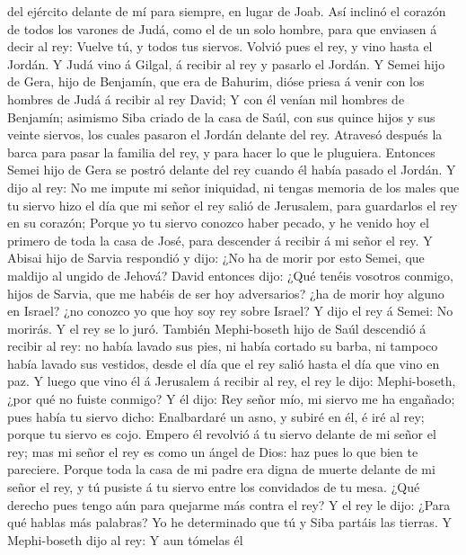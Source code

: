 del ejército delante de mí para siempre, en lugar de Joab. 
Así inclinó el corazón de todos los varones de Judá, como el de un solo
hombre, para que enviasen á decir al rey: Vuelve tú, y todos tus
siervos.  Volvió pues el rey, y vino hasta el Jordán. Y
Judá vino á Gilgal, á recibir al rey y pasarlo el Jordán. 
Y Semei hijo de Gera, hijo de Benjamín, que era de Bahurim, dióse priesa
á venir con los hombres de Judá á recibir al rey David;  Y
con él venían mil hombres de Benjamín; asimismo Siba criado de la casa
de Saúl, con sus quince hijos y sus veinte siervos, los cuales pasaron
el Jordán delante del rey.  Atravesó después la barca para
pasar la familia del rey, y para hacer lo que le pluguiera. Entonces
Semei hijo de Gera se postró delante del rey cuando él había pasado el
Jordán.  Y dijo al rey: No me impute mi señor iniquidad, ni
tengas memoria de los males que tu siervo hizo el día que mi señor el
rey salió de Jerusalem, para guardarlos el rey en su corazón;
 Porque yo tu siervo conozco haber pecado, y he venido hoy
el primero de toda la casa de José, para descender á recibir á mi señor
el rey.  Y Abisai hijo de Sarvia respondió y dijo: ¿No ha
de morir por esto Semei, que maldijo al ungido de Jehová? 
David entonces dijo: ¿Qué tenéis vosotros conmigo, hijos de Sarvia, que
me habéis de ser hoy adversarios? ¿ha de morir hoy alguno en Israel? ¿no
conozco yo que hoy soy rey sobre Israel?  Y dijo el rey á
Semei: No morirás. Y el rey se lo juró.  También
Mephi-boseth hijo de Saúl descendió á recibir al rey: no había lavado
sus pies, ni había cortado su barba, ni tampoco había lavado sus
vestidos, desde el día que el rey salió hasta el día que vino en paz.
 Y luego que vino él á Jerusalem á recibir al rey, el rey
le dijo: Mephi-boseth, ¿por qué no fuiste conmigo?  Y él
dijo: Rey señor mío, mi siervo me ha engañado; pues había tu siervo
dicho: Enalbardaré un asno, y subiré en él, é iré al rey; porque tu
siervo es cojo.  Empero él revolvió á tu siervo delante de
mi señor el rey; mas mi señor el rey es como un ángel de Dios: haz pues
lo que bien te pareciere.  Porque toda la casa de mi padre
era digna de muerte delante de mi señor el rey, y tú pusiste á tu siervo
entre los convidados de tu mesa. ¿Qué derecho pues tengo aún para
quejarme más contra el rey?  Y el rey le dijo: ¿Para qué
hablas más palabras? Yo he determinado que tú y Siba partáis las
tierras.  Y Mephi-boseth dijo al rey: Y aun tómelas él
